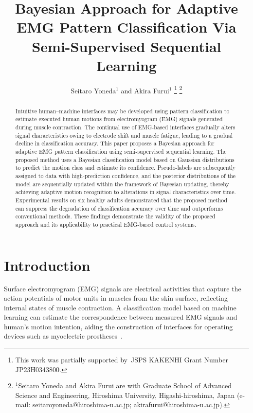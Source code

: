 \documentclass[letterpaper, 10 pt, conference]{ieeeconf}
\title{\LARGE \bf
Bayesian Approach for Adaptive EMG Pattern Classification Via Semi-Supervised Sequential Learning
}
\author{Seitaro Yoneda$^{1}$ and Akira Furui$^{1}$%
\thanks{This work was partially supported by JSPS KAKENHI Grant Number JP23H0343800.}%
\thanks{$^{1}$Seitaro Yoneda and Akira Furui are with Graduate School of Advanced Science and Engineering, Hiroshima University, Higashi-hiroshima, Japan
        (e-mail: seitaroyoneda@hiroshima-u.ac.jp; akirafurui@hiroshima-u.ac.jp).}%
}
\begin{document}
\maketitle
\thispagestyle{empty}
\pagestyle{empty}





\begin{abstract}
Intuitive human--machine interfaces may be developed using pattern classification to estimate executed human motions from electromyogram (EMG) signals generated during muscle contraction. 
The continual use of EMG-based interfaces gradually alters signal characteristics owing to electrode shift and muscle fatigue, leading to a gradual decline in classification accuracy. 
This paper proposes a Bayesian approach for adaptive EMG pattern classification using semi-supervised sequential learning. 
The proposed method uses a Bayesian classification model based on Gaussian distributions to predict the motion class and estimate its confidence. 
Pseudo-labels are subsequently assigned to data with high-prediction confidence, and the posterior distributions of the model are sequentially updated within the framework of Bayesian updating, thereby achieving adaptive motion recognition to alterations in signal characteristics over time. 
Experimental results on six healthy adults demonstrated that the proposed method can suppress the degradation of classification accuracy over time and outperforms conventional methods. 
These findings demonstrate the validity of the proposed approach and its applicability to practical EMG-based control systems.
\end{abstract}




\section{Introduction}
Surface electromyogram (EMG) signals are electrical activities that capture the action potentials of motor units in muscles from the skin surface, reflecting internal states of muscle contraction.
A classification model based on machine learning can estimate the correspondence between measured EMG signals and human's motion intention, aiding the construction of interfaces for operating devices such as myoelectric prostheses~\cite{tsoli2010robot,rezazadeh2012co,fougner2012control,irastorza2017emg}. 
\end{document}
